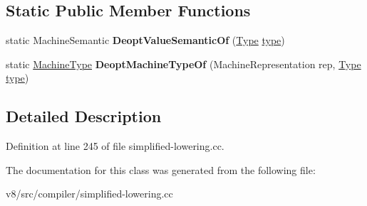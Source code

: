 \subsection*{Static Public Member Functions}
\begin{DoxyCompactItemize}
\item 
\mbox{\label{classv8_1_1internal_1_1compiler_1_1RepresentationSelector_a736147abc69d5697420e93bcff74cef7}} 
static Machine\+Semantic {\bfseries Deopt\+Value\+Semantic\+Of} (\mbox{\hyperlink{classv8_1_1internal_1_1compiler_1_1Type}{Type}} \mbox{\hyperlink{classstd_1_1conditional_1_1type}{type}})
\item 
\mbox{\label{classv8_1_1internal_1_1compiler_1_1RepresentationSelector_a646e6080f7ae0c01e9a0fda32e227603}} 
static \mbox{\hyperlink{classv8_1_1internal_1_1MachineType}{Machine\+Type}} {\bfseries Deopt\+Machine\+Type\+Of} (Machine\+Representation rep, \mbox{\hyperlink{classv8_1_1internal_1_1compiler_1_1Type}{Type}} \mbox{\hyperlink{classstd_1_1conditional_1_1type}{type}})
\end{DoxyCompactItemize}


\subsection{Detailed Description}


Definition at line 245 of file simplified-\/lowering.\+cc.



The documentation for this class was generated from the following file\+:\begin{DoxyCompactItemize}
\item 
v8/src/compiler/simplified-\/lowering.\+cc\end{DoxyCompactItemize}
